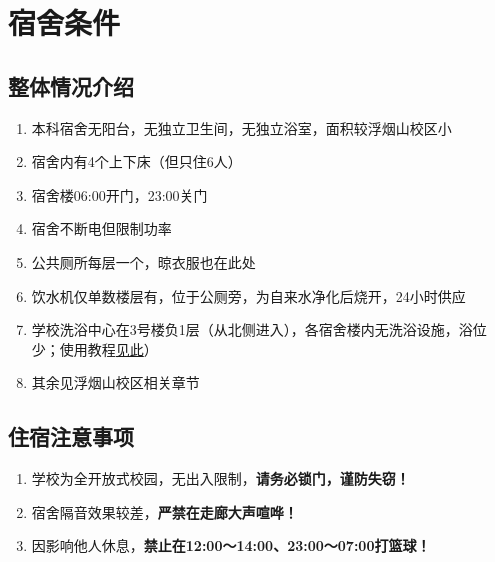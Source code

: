 \section[宿舍条件]{宿舍条件}

\subsection[整体情况介绍]{整体情况介绍}
\begin{enumerate}
    \item 本科宿舍无阳台，无独立卫生间，无独立浴室，面积较浮烟山校区小
    \item 宿舍内有4个上下床（但只住6人）
    \item 宿舍楼06:00开门，23:00关门
    \item 宿舍不断电但限制功率\footnotemark
    \item 公共厕所每层一个，晾衣服也在此处
    \item 饮水机仅单数楼层有，位于公厕旁，为自来水净化后烧开，24小时供应
    \item 学校洗浴中心在3号楼负1层（从北侧进入），各宿舍楼内无洗浴设施，浴位少；使用教程\hyperref[shower_software_y]{见此}）
    \item 其余见浮烟山校区相关章节
\end{enumerate}

\subsection[住宿注意事项]{住宿注意事项}
\begin{enumerate}
    \item 学校为全开放式校园，无出入限制，\textbf{请务必锁门，谨防失窃！}
    \item 宿舍隔音效果较差，\textbf{严禁在走廊大声喧哗！}
    \item 因影响他人休息，\textbf{禁止在12:00～14:00、23:00～07:00打篮球！}
\end{enumerate}